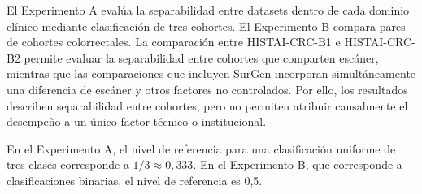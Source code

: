 El Experimento A evalúa la separabilidad entre datasets dentro de cada dominio clínico mediante clasificación de tres cohortes. El Experimento B compara pares de cohortes colorrectales. La comparación entre HISTAI-CRC-B1 e HISTAI-CRC-B2 permite evaluar la separabilidad entre cohortes que comparten escáner, mientras que las comparaciones que incluyen SurGen incorporan simultáneamente una diferencia de escáner y otros factores no controlados. Por ello, los resultados describen separabilidad entre cohortes, pero no permiten atribuir causalmente el desempeño a un único factor técnico o institucional.

En el Experimento A, el nivel de referencia para una clasificación uniforme de tres clases corresponde a $1/3 \approx 0{,}333$. En el Experimento B, que corresponde a clasificaciones binarias, el nivel de referencia es 0,5.

